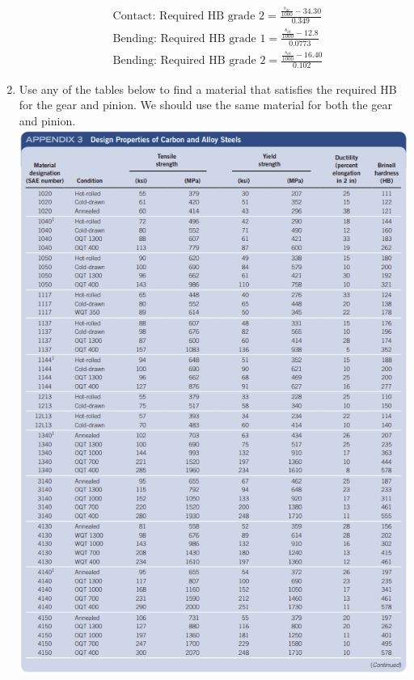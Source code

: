 \documentclass[11pt, fleqn]{article}
\begin{document}
\begin{enumerate}
\begin{align*}
        &\text{Contact: Required HB grade 2}=\frac{\frac{s_{ac}}{1000}-34.30}{0.349}\\
        &\text{Bending: Required HB grade 1}=\frac{\frac{s_{at}}{1000}-12.8}{0.0773}\\
        &\text{Bending: Required HB grade 2}=\frac{\frac{s_{at}}{1000}-16.40}{0.102}
    \end{align*}
    \item Use any of the tables below to find a material that satisfies the required HB for the gear and pinion. We should use the same material for both the gear and pinion.\\
    \includegraphics[scale=1]{Gears/Apx3.png}\\

\end{enumerate}
\end{document}
